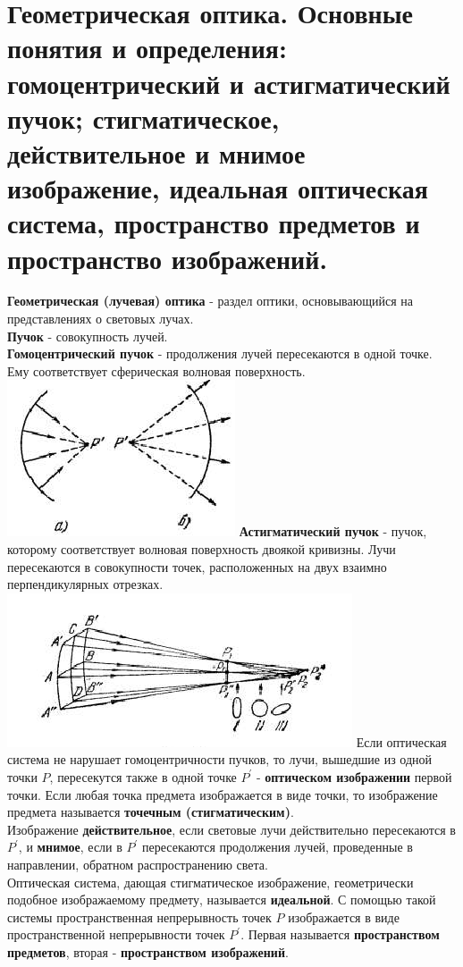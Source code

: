 \documentclass[14pt]{extarticle}
\begin{document}
\section{Геометрическая оптика. Основные понятия и определения: гомоцентрический и
астигматический пучок; стигматическое, действительное и мнимое изображение,
идеальная оптическая система, пространство предметов и пространство изображений.}
\textbf{Геометрическая (лучевая) оптика} - раздел оптики,
основывающийся на представлениях о световых лучах.\\
\textbf{Пучок} - совокупность лучей.\\
\textbf{Гомоцентрический пучок} - продолжения лучей 
пересекаются в одной точке. Ему соответствует сферическая
волновая поверхность. 
\includegraphics{beam_of_rays.png}
\textbf{Астигматический пучок} - пучок, которому соответствует
волновая поверхность двоякой кривизны. Лучи пересекаются
в совокупности точек, расположенных на двух взаимно перпендикулярных
отрезках.
\includegraphics{beam_of_rays2.png}
Если оптическая система не нарушает гомоцентричности пучков,
то лучи, вышедшие из одной точки $P$, пересекутся также в одной
точке $P^{'}$ - \textbf{оптическом изображении} первой точки. Если 
любая точка предмета изображается в виде точки, то изображение
предмета называется \textbf{точечным (стигматическим)}.\\
Изображение \textbf{действительное}, если световые лучи 
действительно пересекаются в $P^{'}$, и \textbf{мнимое},
если в $P^{'}$ пересекаются продолжения лучей, проведенные
в направлении, обратном распространению света.\\
Оптическая система, дающая стигматическое изображение, 
геометрически подобное изображаемому предмету, называется
\textbf{идеальной}. С помощью такой системы 
пространственная непрерывность точек $P$ изображается 
в виде пространственной непрерывности точек $P^{'}$. 
Первая называется \textbf{пространством предметов}, вторая - 
\textbf{пространством изображений}.
\end{document}
